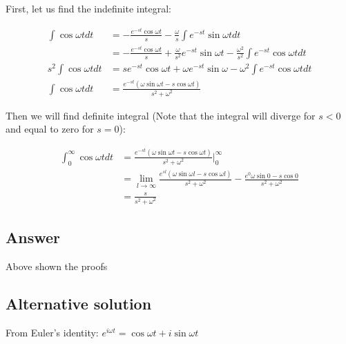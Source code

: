 \begin{enumerate}
        First, let us find the indefinite integral:

        \begin{displaymath}
            \begin{aligned}
                \int \cos{\omega t} dt & = -\frac{e^{-st} \cos{\omega t}}{s} - \frac{\omega}{s} \int e^{-st} \sin{\omega t} dt \\
                & = -\frac{e^{-st} \cos{\omega t}}{s} + \frac{\omega}{s^2} e^{-st} \sin{\omega t} - \frac{\omega^2}{s^2} \int e^{-st} \cos{\omega t} dt \\
                s^2 \int \cos{\omega t} dt & = s e^{-st} \cos{\omega t} + \omega e^{-st} \sin{\omega} - \omega^2 \int e^{-st} \cos{\omega t} dt \\
                \int \cos{\omega t} dt & = \frac{e^{-st} (\omega \sin{\omega t} - s \cos{\omega t})}{s^2 + \omega^2}
            \end{aligned}
        \end{displaymath}
        
        Then we will find definite integral (Note that the integral will diverge for $s < 0$ and equal to zero for $s = 0$):
        
        \begin{displaymath}
            \begin{aligned}
                \int_0^{\infty} \cos{\omega t} dt & = \frac{e^{-st} (\omega \sin{\omega t} - s \cos{\omega t})}{s^2 + \omega^2} \Bigr|_0^{\infty} \\
                & = \lim_{l \to \infty} \frac{e^{sl} (\omega \sin{\omega l} - s \cos{\omega l})}{s^2 + \omega^2} - \frac{e^0 \omega \sin{0} - s \cos{0}}{s^2 + \omega^2} \\
                & = \frac{s}{s^2 + \omega^2}
            \end{aligned}
        \end{displaymath}
\end{enumerate}

\subsection*{Answer}

Above shown the proofs

\subsection*{Alternative solution}

From Euler's identity: $e^{i \omega t} = \cos{\omega t} + i\sin{\omega t}$

